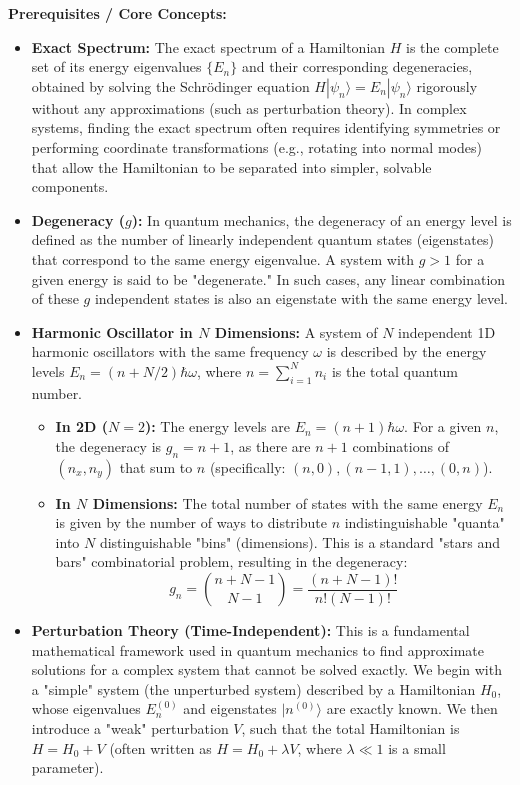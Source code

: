 \begin{solution}
\textbf{Prerequisites / Core Concepts:}
\begin{itemize}
    \item \textbf{Exact Spectrum:} The exact spectrum of a Hamiltonian $H$ is the complete set of its energy eigenvalues $\{E_n\}$ and their corresponding degeneracies, obtained by solving the Schrödinger equation $H|\psi_n\rangle = E_n |\psi_n\rangle$ rigorously without any approximations (such as perturbation theory). In complex systems, finding the exact spectrum often requires identifying symmetries or performing coordinate transformations (e.g., rotating into normal modes) that allow the Hamiltonian to be separated into simpler, solvable components.
    \item \textbf{Degeneracy ($g$):} In quantum mechanics, the degeneracy of an energy level is defined as the number of linearly independent quantum states (eigenstates) that correspond to the same energy eigenvalue. A system with $g > 1$ for a given energy is said to be "degenerate." In such cases, any linear combination of these $g$ independent states is also an eigenstate with the same energy level.
    \item \textbf{Harmonic Oscillator in $N$ Dimensions:} A system of $N$ independent 1D harmonic oscillators with the same frequency $\omega$ is described by the energy levels $E_n = (n + N/2)\hbar\omega$, where $n = \sum_{i=1}^N n_i$ is the total quantum number.
    \begin{itemize}
        \item \textbf{In 2D ($N=2$):} The energy levels are $E_n = (n+1)\hbar\omega$. For a given $n$, the degeneracy is $g_n = n+1$, as there are $n+1$ combinations of $(n_x, n_y)$ that sum to $n$ (specifically: $(n, 0), (n-1, 1), \dots, (0, n)$).
        \item \textbf{In $N$ Dimensions:} The total number of states with the same energy $E_n$ is given by the number of ways to distribute $n$ indistinguishable "quanta" into $N$ distinguishable "bins" (dimensions). This is a standard "stars and bars" combinatorial problem, resulting in the degeneracy:
        \begin{equation*}
            g_n = \binom{n + N - 1}{N - 1} = \frac{(n + N - 1)!}{n! (N - 1)!}
        \end{equation*}
    \end{itemize}
    \item \textbf{Perturbation Theory (Time-Independent):} This is a fundamental mathematical framework used in quantum mechanics to find approximate solutions for a complex system that cannot be solved exactly. We begin with a "simple" system (the unperturbed system) described by a Hamiltonian $H_0$, whose eigenvalues $E_n^{(0)}$ and eigenstates $|n^{(0)}\rangle$ are exactly known. We then introduce a "weak" perturbation $V$, such that the total Hamiltonian is $H = H_0 + V$ (often written as $H = H_0 + \lambda V$, where $\lambda \ll 1$ is a small parameter).

\end{itemize}
\end{solution}
